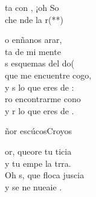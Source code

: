 \documentclass[12pt]{article}
\begin{document}
\begin{multicols*}{2}
\begin{cancion}%
	ta con , ¡oh So\\
	che  nde la r(**)\\
\end{cancion}%

\begin{cancion}%
	o enñanos arar, \\
	ta de mi mente\\
	s esquemas del do(  \\
	que me encuentre cogo,\\
	y s lo que eres de :\\
	ro encontrarme cono\\
	y r lo que eres de .\\
\end{cancion}%

\begin{cancion}%
	ñor escúcosCroyos \\
\end{cancion}%

\begin{cancion}%
	or, queore tu ticia \\
	y tu  empe la trra.\\
	Oh s, que floca  juscia\\
	y se ne nueaie .\\
\end{cancion}%


\end{multicols*}
\end{document}
